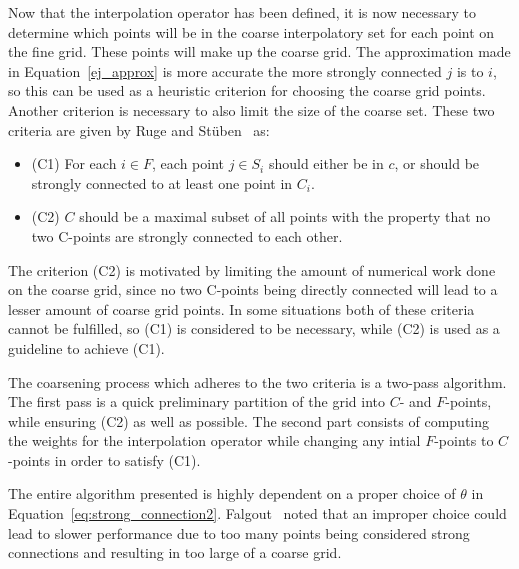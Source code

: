 Now that the interpolation operator has been defined, it is now necessary to determine which points will be in the coarse interpolatory set for each point on the fine grid. These points will make up the coarse grid. The approximation made in Equation~\ref{ej_approx} is more accurate the more strongly connected $j$ is to $i$, so this can be used as a heuristic criterion for choosing the coarse grid points. Another criterion is necessary to also limit the size of the coarse set. These two criteria are given by Ruge and Stüben~\cite{Ruge1987} as:

\begin{itemize}
	\item (C1) For each $i \in F$, each point $j \in S_i$ should either be in $c$, or should be strongly connected to at least one point in $C_i$.
	\item (C2) $C$ should be a maximal subset of all points with the property that no two C-points are strongly connected to each other.
\end{itemize}

The criterion (C2) is motivated by limiting the amount of numerical work done on the coarse grid, since no two C-points being directly connected will lead to a lesser amount of coarse grid points. In some situations both of these criteria cannot be fulfilled, so (C1) is considered to be necessary, while (C2) is used as a guideline to achieve (C1).

The coarsening process which adheres to the two criteria is a two-pass algorithm. The first pass is a quick preliminary partition of the grid into $C$- and $F$-points, while ensuring (C2) as well as possible. The second part consists of computing the weights for the interpolation operator while changing any intial $F$-points to $C$-points in order to satisfy (C1).

The entire algorithm presented is highly dependent on a proper choice of $\theta$ in Equation~\ref{eq:strong_connection2}. Falgout~\cite{Falgout2006} noted that an improper choice could lead to slower performance due to too many points being considered strong connections and resulting in too large of a coarse grid.

